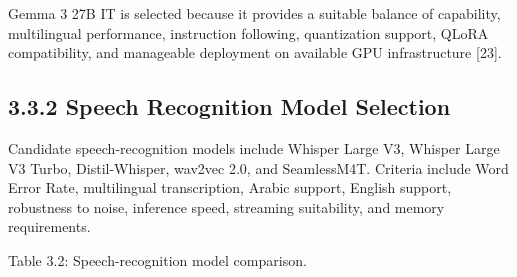 \documentclass[
  letterpaper,
  12pt,
  a4paper,
  openany]{report}
\begin{document}
Gemma 3 27B IT is selected because it provides a suitable balance of
capability, multilingual performance, instruction following,
quantization support, QLoRA compatibility, and manageable deployment on
available GPU infrastructure {[}23{]}.

\subsection{3.3.2 Speech Recognition Model
Selection}\label{speech-recognition-model-selection}

Candidate speech-recognition models include Whisper Large V3, Whisper
Large V3 Turbo, Distil-Whisper, wav2vec 2.0, and SeamlessM4T. Criteria
include Word Error Rate, multilingual transcription, Arabic support,
English support, robustness to noise, inference speed, streaming
suitability, and memory requirements.

Table 3.2: Speech-recognition model comparison.
\end{document}
